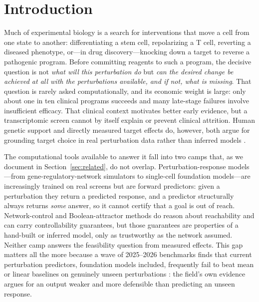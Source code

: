 \section{Introduction}
\label{sec:intro}

Much of experimental biology is a search for interventions that move a cell from one state
to another: differentiating a stem cell, repolarizing a T cell, reverting a diseased
phenotype, or---in drug discovery---knocking down a target to reverse a pathogenic program.
Before committing reagents to such a program, the decisive question is not \emph{what will
this perturbation do} but \emph{can the desired change be achieved at all with the
perturbations available, and if not, what is missing}. That question is rarely asked
computationally, and its economic weight is large: only about one in ten clinical
programs succeeds and many late-stage failures involve insufficient efficacy. That clinical
context motivates better early evidence, but a transcriptomic screen cannot by itself explain
or prevent clinical attrition. Human genetic support and directly measured target effects do,
however, both argue for grounding target choice in real perturbation data rather than inferred
models \citep{Minikel2024,Nelson2015,Harrison2016,%
BegleyEllis2012,Prinz2011}.

The computational tools available to answer it fall into two camps that, as we document in
Section~\ref{sec:related}, do not overlap. Perturbation-response models---from
gene-regulatory-network simulators to single-cell foundation models---are increasingly
trained on real screens but are forward predictors: given a perturbation they return a
predicted response, and a predictor structurally always returns \emph{some} answer, so it
cannot certify that a goal is out of reach. Network-control and Boolean-attractor methods
do reason about reachability and can carry controllability guarantees, but those guarantees
are properties of a hand-built or inferred model, only as trustworthy as the network
assumed. Neither camp answers the feasibility question from measured effects. This gap
matters all the more because a wave of 2025--2026 benchmarks finds that current
perturbation predictors, foundation models included, frequently fail to beat mean or linear
baselines on genuinely unseen perturbations \citep{AhlmannEltze2025,Wong2025,Kernfeld2025,%
Atti2025}: the field's own evidence argues for an output weaker and more defensible than
predicting an unseen response.

